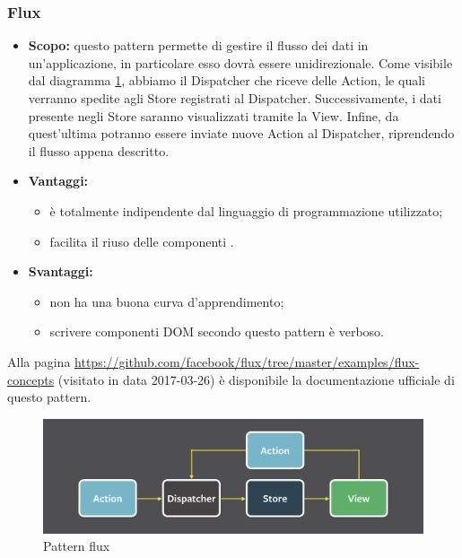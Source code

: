     \subsubsection{Flux}
    \begin{itemize}
    	\item \textbf{Scopo:} questo pattern permette di gestire il flusso dei dati in un'applicazione, in particolare esso dovrà essere unidirezionale. Come visibile dal diagramma \ref{fig:flux}, abbiamo il Dispatcher che riceve delle Action, le quali verranno spedite agli Store registrati al Dispatcher. Successivamente, i dati presente negli Store saranno visualizzati tramite la View. Infine, da quest'ultima potranno essere inviate nuove Action al Dispatcher, riprendendo il flusso appena descritto.
    	\item \textbf{Vantaggi:}
    	\begin{itemize}
    		\item è totalmente indipendente dal linguaggio di programmazione utilizzato;
    		\item facilita il riuso delle componenti .
    	\end{itemize}
    	\item \textbf{Svantaggi:}
    	\begin{itemize}
    		\item non ha una buona curva d'apprendimento;
    		\item scrivere componenti DOM secondo questo pattern è verboso.
    	\end{itemize}
    \end{itemize}
    Alla pagina \url{https://github.com/facebook/flux/tree/master/examples/flux-concepts} (visitato in data 2017-03-26) è disponibile la documentazione ufficiale di questo pattern.
    \begin{figure}[h]
    	\centering
    	\includegraphics[width=\textwidth,height=\textheight,keepaspectratio]{images/fluxpattern.png}
    	\caption{Pattern flux}\label{fig:flux}

    \end{figure}
    \newpage
    
